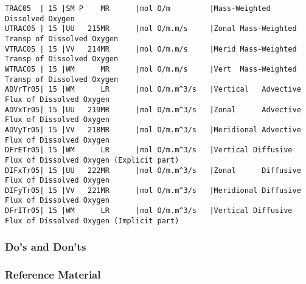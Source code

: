{\begin{verbatim}
TRAC05  | 15 |SM P    MR      |mol O/m         |Mass-Weighted Dissolved Oxygen
UTRAC05 | 15 |UU   215MR      |mol O/m.m/s     |Zonal Mass-Weighted Transp of Dissolved Oxygen
VTRAC05 | 15 |VV   214MR      |mol O/m.m/s     |Merid Mass-Weighted Transp of Dissolved Oxygen
WTRAC05 | 15 |WM      MR      |mol O/m.m/s     |Vert  Mass-Weighted Transp of Dissolved Oxygen
ADVrTr05| 15 |WM      LR      |mol O/m.m^3/s   |Vertical   Advective Flux of Dissolved Oxygen
ADVxTr05| 15 |UU   219MR      |mol O/m.m^3/s   |Zonal      Advective Flux of Dissolved Oxygen
ADVyTr05| 15 |VV   218MR      |mol O/m.m^3/s   |Meridional Advective Flux of Dissolved Oxygen
DFrETr05| 15 |WM      LR      |mol O/m.m^3/s   |Vertical Diffusive Flux of Dissolved Oxygen (Explicit part)
DIFxTr05| 15 |UU   222MR      |mol O/m.m^3/s   |Zonal      Diffusive Flux of Dissolved Oxygen
DIFyTr05| 15 |VV   221MR      |mol O/m.m^3/s   |Meridional Diffusive Flux of Dissolved Oxygen
DFrITr05| 15 |WM      LR      |mol O/m.m^3/s   |Vertical Diffusive Flux of Dissolved Oxygen (Implicit part)

\end{verbatim}
}

\subsubsection{Do's and Don'ts}

\subsubsection{Reference Material}


